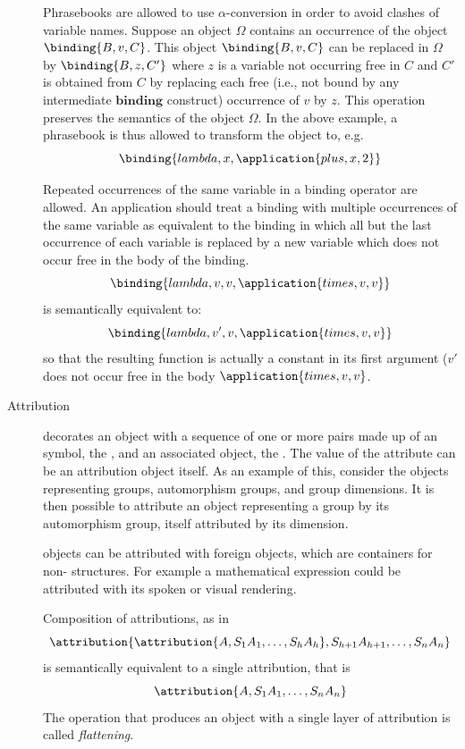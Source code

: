 \begin{description}
Phrasebooks are allowed to use $\alpha$-conversion in order to avoid clashes of
variable names. Suppose an object $\Omega$ contains an occurrence of the object
$\binding{B,v,C}$.  This object $\binding{B,v,C}$ can be replaced in $\Omega$ by
$\binding{B,z,C'}$ where $z$ is a variable not occurring free in $C$ and $C'$ is obtained
from $C$ by replacing each free (i.e., not bound by any intermediate $\mathbf{binding}$
construct) occurrence of $v$ by $z$.  This operation preserves the semantics of the object
$\Omega$. In the above example, a phrasebook is thus allowed to transform the object to,
e.g.
\[\binding{lambda,x,\application{plus,x,2}}\]


Repeated occurrences of the same variable in a binding operator
  are allowed. An \OM application should treat a binding with
  multiple occurrences of the same variable as equivalent to the
  binding in which all but the last occurrence of each variable is
  replaced by a new variable which does not occur free in the body of
  the binding.
  \[\binding{lambda,v,v,\application{times,v,v}}\]
is semantically
  equivalent to: 
  \[\binding{lambda,v',v,\application{times,v,v}}\]
  so that the resulting function is actually a constant in its first argument ($v'$ does
  not occur free in the body $\application{times,v,v}$.

\item[Attribution] decorates an object with a sequence of one or more pairs made up of an
  \OM symbol, the , and an associated object, the .  The value of the attribute can be an \OM attribution object
  itself. As an example of this, consider the \OM objects representing groups,
  automorphism groups, and group dimensions. It is then possible to attribute an \OM
  object representing a group by its automorphism group, itself attributed by its
  dimension.

  \OM objects can be attributed with \OM foreign objects, which are containers for non-\OM
  structures.  For example a mathematical expression could be attributed with its spoken
  or visual rendering.



Composition of attributions, as in
\[\attribution{\attribution{A,S_1 A_1,\ldots, S_h A_h}, S_{h+1} A_{h+1},\ldots, S_n A_n}\] 
is semantically equivalent to a single attribution, that is
\[\attribution{A,S_1 A_1,\ldots, S_n A_n}\] 
The operation that produces an object with a single layer of attribution is called
\emph{flattening}.


\end{description}
